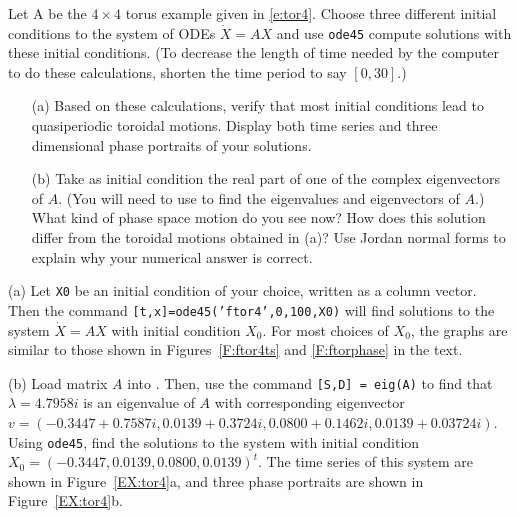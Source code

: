 \documentclass{ximera}
\begin{document}
\begin{computerExercise}  \label{EX:tor4}
Let A be the $4\times 4$ torus example given in \eqref{e:tor4}.  Choose three 
different initial conditions to the system of ODEs $\dot{X}=AX$ and use 
{\tt ode45} compute solutions with these initial conditions.  (To decrease 
the length of time needed by the computer to do these calculations, shorten 
the time period to say $[0,30]$.)  
\begin{itemize}
\item[(a)]  Based on these calculations, verify that most initial conditions 
lead to quasiperiodic toroidal motions.  Display both time series and 
three dimensional phase portraits of your solutions. 
\item[(b)]  Take as initial condition the real part of one of the complex
eigenvectors of $A$.  (You will need to use \Matlab to find the eigenvalues
and eigenvectors of $A$.)  What kind of phase space motion do you see now? 
How does this solution differ from the toroidal motions obtained in (a)? 
Use Jordan normal forms to explain why your numerical answer is correct.
\end{itemize}

\begin{solution}

(a) Let {\tt X0} be an initial condition of your choice, written as a
column vector.  Then the command {\tt [t,x]=ode45('ftor4',0,100,X0)}
will find solutions to the system $\dot{X} = AX$ with initial condition
$X_0$.  For most choices of $X_0$, the graphs are similar to those shown
in Figures~\ref{F:ftor4ts} and \ref{F:ftorphase} in the text.

(b) Load matrix $A$ into \Matlabp.  Then, use the command
{\tt [S,D] = eig(A)} to find that $\lambda = 4.7958i$ is an eigenvalue of
$A$ with corresponding eigenvector $v = (-0.3447 + 0.7587i, 0.0139 +
0.3724i, 0.0800 + 0.1462i, 0.0139 + 0.03724i)$.  Using {\tt ode45}, find
the solutions to the system with initial condition $X_0 = (-0.3447, 0.0139,
0.0800, 0.0139)^t$.  The time series of this system are shown in
Figure~\ref{EX:tor4}a, and three phase portraits are shown in
Figure~\ref{EX:tor4}b.

\begin{figure}[htb]
                       \centerline{%
			\hspace{1.0in}
                       }
\end{figure}

\end{solution}
\end{computerExercise} 
\end{document}
